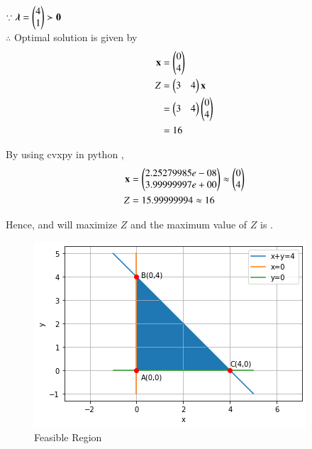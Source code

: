 \documentclass[journal,12pt,twocolumn]{IEEEtran}
\begin{document}
$\because \boldsymbol{\lambda}=\begin{pmatrix}4 \\ 1\end{pmatrix} \succ \mathbf{0} $
\\
$\therefore$ Optimal solution is given by
\begin{align}
    \mathbf{x} &= \begin{pmatrix}0\\4\end{pmatrix} \\
    Z &= \begin{pmatrix}3 & 4\end{pmatrix}\mathbf{x} \\
    &= \begin{pmatrix}3 & 4\end{pmatrix}\begin{pmatrix}0 \\ 4\end{pmatrix} \\
    &= 16
\end{align}

By using cvxpy in python ,
\begin{align}
    \mathbf{x} &= \begin{pmatrix}2.25279985e-08\\3.99999997e+00\end{pmatrix} \approx \begin{pmatrix}0 \\ 4\end{pmatrix} \\
    Z &= 15.99999994 \approx 16
\end{align}

Hence,  and  will maximize $Z$ and the maximum value of $Z$ is  .

\begin{figure}[!ht]
\centering
\includegraphics[width=\columnwidth]{Figure15}
\caption{Feasible Region}
\label{fig:Feasible Region}	
\end{figure}
\end{document}
